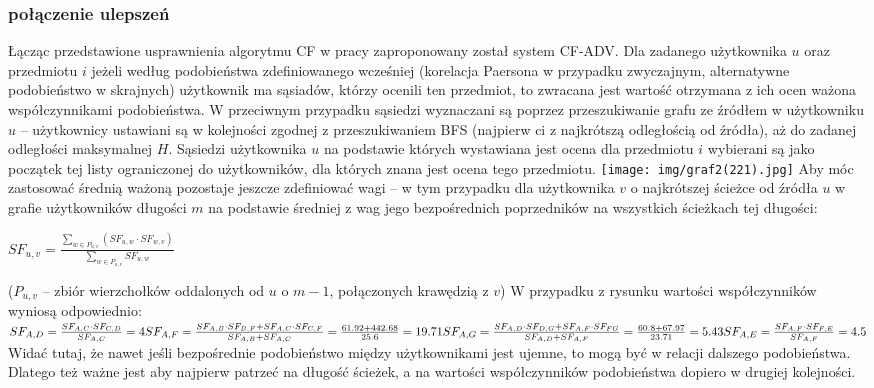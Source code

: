 \documentclass{pracamgr}
\begin{document}
    \subsubsection{połączenie ulepszeń}
     Łącząc przedstawione usprawnienia algorytmu CF w pracy \cite{221} zaproponowany został system CF-ADV.\newline
     Dla zadanego użytkownika $u$ oraz przedmiotu $i$ jeżeli według podobieństwa zdefiniowanego wcześniej
     (korelacja Paersona w przypadku zwyczajnym, alternatywne podobieństwo w skrajnych) użytkownik ma sąsiadów, którzy ocenili ten przedmiot,
     to zwracana jest wartość otrzymana z ich ocen ważona współczynnikami podobieństwa.\newline
     W przeciwnym przypadku sąsiedzi wyznaczani są poprzez przeszukiwanie grafu ze źródłem w użytkowniku $u$
     -- użytkownicy ustawiani są w kolejności zgodnej z przeszukiwaniem BFS (najpierw ci z najkrótszą odległością od źródła),
     aż do zadanej odległości maksymalnej $H$.
     Sąsiedzi użytkownika $u$ na podstawie których wystawiana jest ocena dla przedmiotu $i$
     wybierani są jako początek tej listy ograniczonej do użytkowników, dla których znana jest ocena tego przedmiotu.\newline
     \texttt{[image: img/graf2(221).jpg]}\newline
     Aby móc zastosować średnią ważoną pozostaje jeszcze zdefiniować wagi
     -- w tym przypadku dla użytkownika $v$ o najkrótszej ścieżce od źródła $u$ w grafie użytkowników długości $m$
     na podstawie średniej z wag jego bezpośrednich poprzedników na wszystkich ścieżkach tej długości:
     \begin{center}
      $SF_{u,v}=\frac{\sum\limits_{w\in P_{u,v}}(SF_{u,w}\cdot SF_{w,v})}{\sum\limits_{w\in P_{u,v}}SF_{u,w}}$
     \end{center}
     {\scriptsize
      ($P_{u,v}$ -- zbiór wierzchołków oddalonych od $u$ o $m-1$, połączonych krawędzią z $v$)
     }\newline
     W przypadku z rysunku wartości współczynników wyniosą odpowiednio:\newline
     $
     SF_{A,D}=\frac{SF_{A,C}\cdot SF_{C,D}}{SF_{A,C}}=4\newline
     SF_{A,F}=\frac{SF_{A,B}\cdot SF_{B,F}+SF_{A,C}\cdot SF_{C,F}}{SF_{A,B}+SF_{A,C}}=\frac{61.92+442.68}{25.6}=19.71\newline
     SF_{A,G}=\frac{SF_{A,D}\cdot SF_{D,G}+SF_{A,F}\cdot SF_{FG}}{SF_{A,D}+SF_{A,F}}=\frac{60.8+67.97}{23.71}=5.43\newline
     SF_{A,E}=\frac{SF_{A,F}\cdot SF_{F,E}}{SF_{A,F}}=4.5\newline   
     $
     Widać tutaj, że nawet jeśli bezpośrednie podobieństwo między użytkownikami jest ujemne, to mogą być w relacji dalszego podobieństwa.
     Dlatego też ważne jest aby najpierw patrzeć na długość ścieżek, a na wartości współczynników podobieństwa dopiero w drugiej kolejności.
\end{document}
